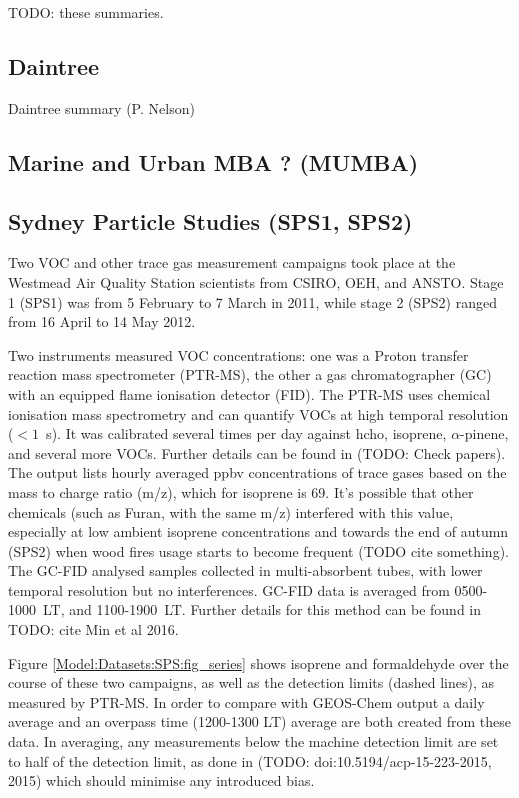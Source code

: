   TODO: these summaries.
  
  \subsection{Daintree}
    Daintree summary (P. Nelson)
  
  \subsection{Marine and Urban MBA ? (MUMBA)}
    \label{Model:Datasets:MUMBA}
  
  \subsection{Sydney Particle Studies (SPS1, SPS2)}
    \label{Model:Datasets:SPS}
    Two VOC and other trace gas measurement campaigns took place at the Westmead Air Quality Station scientists from CSIRO, OEH, and ANSTO. 
    Stage 1 (SPS1) was from 5 February to 7 March in 2011, while stage 2 (SPS2) ranged from 16 April to 14 May 2012.
    
    Two instruments measured VOC concentrations: one was a Proton transfer reaction mass spectrometer (PTR-MS), the other a gas chromatographer (GC) with an equipped flame ionisation detector (FID).
    The PTR-MS uses chemical ionisation mass spectrometry and can quantify VOCs at high temporal resolution ($< 1$~s).
    It was calibrated several times per day against hcho, isoprene, $\alpha$-pinene, and several more VOCs. Further details can be found in \cite{Dunne2012, Dunne2017} (TODO: Check papers).
    The output lists hourly averaged ppbv concentrations of trace gases based on the mass to charge ratio (m/z), which for isoprene is 69.
    It's possible that other chemicals (such as Furan, with the same m/z) interfered with this value, especially at low ambient isoprene concentrations and towards the end of autumn (SPS2) when wood fires usage starts to become frequent (TODO cite something).
    The GC-FID analysed samples collected in multi-absorbent tubes, with lower temporal resolution but no interferences. GC-FID data is averaged from 0500-1000~LT, and 1100-1900~LT. Further details for this method can be found in TODO: cite Min et al 2016.
    
    Figure \ref{Model:Datasets:SPS:fig_series} shows isoprene and formaldehyde over the course of these two campaigns, as well as the detection limits (dashed lines), as measured by PTR-MS. In order to compare with GEOS-Chem output a daily average and an overpass time (1200-1300 LT) average are both created from these data.
    In averaging, any measurements below the machine detection limit are set to half of the detection limit, as done in (TODO: doi:10.5194/acp-15-223-2015, 2015) which should minimise any introduced bias.
    
